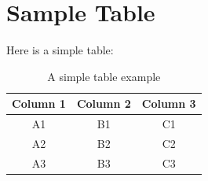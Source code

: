 \documentclass[a4paper]{article}
\begin{document}


\section{Sample Table}

Here is a simple table:

\begin{table}[h]
    \centering
    \begin{tabular}{|c|c|c|}
        \hline
        Column 1 & Column 2 & Column 3 \\
        \hline
        A1 & B1 & C1 \\
        A2 & B2 & C2 \\
        A3 & B3 & C3 \\
        \hline
    \end{tabular}
    \caption{A simple table example}
    \label{tab:example}
\end{table}
\end{document}
